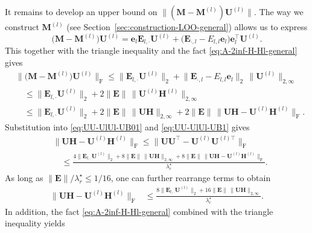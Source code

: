 It remains to develop an upper bound on $\| (\bm{M}-\bm{M}^{(l)} )\bm{U}^{(l)} \|$.
The way we construct $\bm{M}^{(l)}$ (see Section~\ref{sec:construction-LOO-general}) allows us to express
%
\[
	\big(\bm{M}-\bm{M}^{(l)}\big)\bm{U}^{(l)}=\bm{e}_{l}\bm{E}_{l,\cdot}\bm{U}^{(l)}+  \big(\bm{E}_{\cdot,l} - E_{l,l} \bm{e}_l \big)  \bm{e}_{l}^{\top}\bm{U}^{(l)}.
\]
%
This together with the triangle inequality and the fact \eqref{eq:A-2inf-H-Hl-general} gives
%
\begin{align*}
 & \big\|\big(\bm{M}-\bm{M}^{(l)}\big)\bm{U}^{(l)}\big\|_{\mathrm{F}}\leq\big\|\bm{E}_{l,\cdot}\bm{U}^{(l)}\big\|_{2}+\big\|\bm{E}_{\cdot,l} - E_{l,l} \bm{e}_l \big\|_{2}\,\big\|\bm{U}^{(l)}\big\|_{2,\infty}\\
 & \quad\leq\big\|\bm{E}_{l,\cdot}\bm{U}^{(l)}\big\|_{2}+2\big\|\bm{E}\big\|\, \big\|\bm{U}^{(l)}\bm{H}^{(l)}\big\|_{2,\infty}\\
 & \quad\leq\big\|\bm{E}_{l,\cdot}\bm{U}^{(l)}\big\|_{2}+2\big\|\bm{E}\big\|\, \big\|\bm{U}\bm{H}\big\|_{2,\infty}+2\big\|\bm{E}\big\|\,\big\|\bm{U}\bm{H}-\bm{U}^{(l)}\bm{H}^{(l)}\big\|_{\mathrm{F}}.
\end{align*}
%
%
Substitution into \eqref{eq:UU-UlUl-UB01} and \eqref{eq:UU-UlUl-UB1} gives
%
\begin{align*}
 & \big\|\bm{U}\bm{H}-\bm{U}^{(l)}\bm{H}^{(l)}\big\|_{\mathrm{F}} \leq \big\|\bm{U}\bm{U}^{\top}-\bm{U}^{(l)}\bm{U}^{(l)\top}\big\|_{\mathrm{F}} \\
 & \quad\leq\frac{4\big\|\bm{E}_{l,\cdot}\bm{U}^{(l)}\big\|_{2}+8\big\|\bm{E}\big\|\,\big\|\bm{U}\bm{H}\big\|_{2,\infty}+8\big\|\bm{E}\big\|\, \big\|\bm{U}\bm{H}-\bm{U}^{(l)}\bm{H}^{(l)}\big\|_{\mathrm{F}}}{\lambda_{r}^{\star}}.
\end{align*}
%
As long as $\|\bm{E}\|/\lambda_r^{\star}\leq 1/16$,
 one can further rearrange terms to obtain
%
\begin{align}
\big\|\bm{U}\bm{H}-\bm{U}^{(l)}\bm{H}^{(l)}\big\|_{\mathrm{F}} & \leq\frac{8\big\|\bm{E}_{l,\cdot}\bm{U}^{(l)}\big\|_{2}+16\big\|\bm{E}\big\|\, \big\|\bm{U}\bm{H}\big\|_{2,\infty}}{\lambda_{r}^{\star}}.
	\label{eq:UH-UlHl-diff-UB10}
\end{align}
%
In addition, the fact  \eqref{eq:A-2inf-H-Hl-general} combined with the triangle inequality yields
